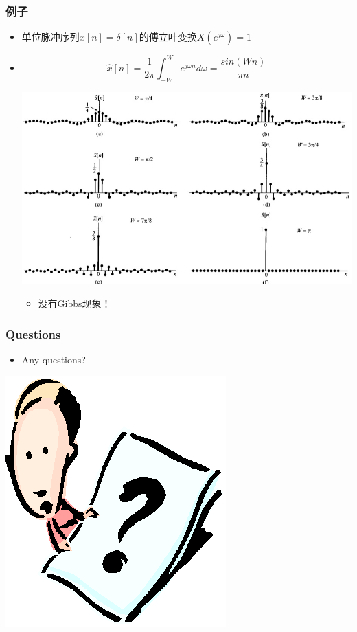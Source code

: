 \documentclass[CJKutf8,xcolor=pdftex,dvipsnames,table]{beamer}
\begin{document}
\begin{CJK*}{UTF8}{song}
  \begin{frame}
    \frametitle{例子}
    \begin{itemize}
    \item 单位脉冲序列$x[n]=\delta[n]$的傅立叶变换$X(e^{j\omega})=1$
	\item 
	\[
	\hat{x}[n] = \frac{1}{2\pi}\int_{-W}^{W} e^{j\omega n}d\omega = \frac{sin(Wn)}{\pi n}
	\]    
    	\begin{center}
    	\includegraphics[scale=.3]{ss-c-f5-7}
    	\end{center}   
		\begin{itemize}
		\item 没有Gibbs现象！
		\end{itemize}
    \end{itemize}

  \end{frame}    
        
  \begin{frame}
    \frametitle{Questions}
    \begin{itemize}
    \item Any questions?
    \end{itemize}
    \begin{center}
      \includegraphics[scale=.5]{question}
    \end{center}
  \end{frame}     
  

\end{CJK*}
\end{document}
